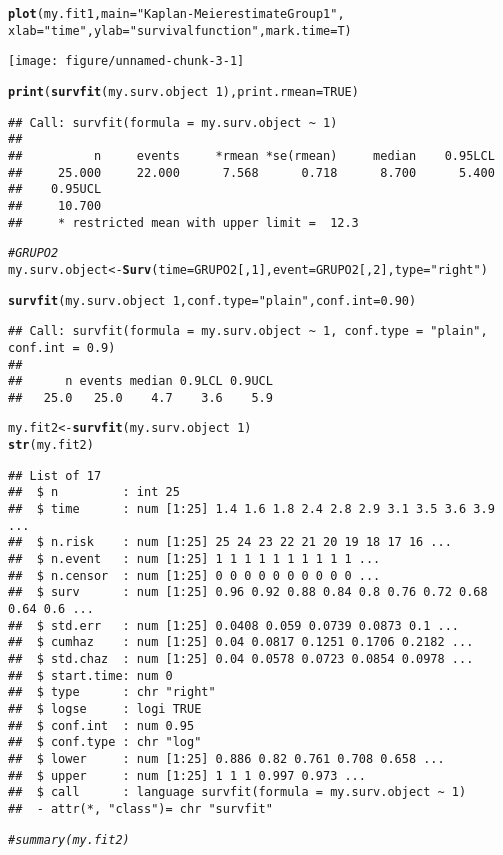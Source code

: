 \documentclass[10pt]{article}\usepackage[]{graphicx}\usepackage[]{color}
\makeatletter
\def\maxwidth{ %
  \ifdim\Gin@nat@width>\linewidth
    \linewidth
  \else
    \Gin@nat@width
  \fi
}
\newcommand{\hlnum}[1]{\textcolor[rgb]{0.686,0.059,0.569}{#1}}%
\newcommand{\hlstr}[1]{\textcolor[rgb]{0.192,0.494,0.8}{#1}}%
\newcommand{\hlcom}[1]{\textcolor[rgb]{0.678,0.584,0.686}{\textit{#1}}}%
\newcommand{\hlopt}[1]{\textcolor[rgb]{0,0,0}{#1}}%
\newcommand{\hlstd}[1]{\textcolor[rgb]{0.345,0.345,0.345}{#1}}%
\newcommand{\hlkwb}[1]{\textcolor[rgb]{0.69,0.353,0.396}{#1}}%
\newcommand{\hlkwc}[1]{\textcolor[rgb]{0.333,0.667,0.333}{#1}}%
\newcommand{\hlkwd}[1]{\textcolor[rgb]{0.737,0.353,0.396}{\textbf{#1}}}%
\newenvironment{kframe}{%
 \def\at@end@of@kframe{}%
 \ifinner\ifhmode%
  \def\at@end@of@kframe{\end{minipage}}%
  \begin{minipage}{\columnwidth}%
 \fi\fi%
 \def\FrameCommand##1{\hskip\@totalleftmargin \hskip-\fboxsep
 \colorbox{shadecolor}{##1}\hskip-\fboxsep
     \hskip-\linewidth \hskip-\@totalleftmargin \hskip\columnwidth}%
 \MakeFramed {\advance\hsize-\width
   \@totalleftmargin\z@ \linewidth\hsize
   \@setminipage}}%
 {\par\unskip\endMakeFramed%
 \at@end@of@kframe}
\newenvironment{knitrout}{}{} %
\makeatother
\begin{document}
{\begin{itemize}
\begin{knitrout}
\begin{kframe}
\begin{alltt}
\hlkwd{plot}\hlstd{(my.fit1,} \hlkwc{main}\hlstd{=}\hlstr{"Kaplan-Meier estimate Group 1"}\hlstd{,}
     \hlkwc{xlab}\hlstd{=}\hlstr{"time"}\hlstd{,} \hlkwc{ylab}\hlstd{=}\hlstr{"survival function"}\hlstd{,}\hlkwc{mark.time}\hlstd{=T)}
\end{alltt}
\end{kframe}
\texttt{[image: figure/unnamed-chunk-3-1]} 
\begin{kframe}\begin{alltt}
\hlkwd{print}\hlstd{(}\hlkwd{survfit}\hlstd{(my.surv.object} \hlopt{~} \hlnum{1}\hlstd{),} \hlkwc{print.rmean}\hlstd{=}\hlnum{TRUE}\hlstd{)}
\end{alltt}
\begin{verbatim}
## Call: survfit(formula = my.surv.object ~ 1)
## 
##          n     events     *rmean *se(rmean)     median    0.95LCL 
##     25.000     22.000      7.568      0.718      8.700      5.400 
##    0.95UCL 
##     10.700 
##     * restricted mean with upper limit =  12.3
\end{verbatim}
\begin{alltt}
\hlcom{#GRUPO 2}
\hlstd{my.surv.object}\hlkwb{<-}\hlkwd{Surv}\hlstd{(}\hlkwc{time}\hlstd{=GRUPO2[,}\hlnum{1}\hlstd{],}\hlkwc{event} \hlstd{= GRUPO2[,}\hlnum{2}\hlstd{],} \hlkwc{type} \hlstd{=} \hlstr{"right"}\hlstd{)}

\hlkwd{survfit}\hlstd{(my.surv.object} \hlopt{~} \hlnum{1}\hlstd{,}\hlkwc{conf.type}\hlstd{=}\hlstr{"plain"}\hlstd{,} \hlkwc{conf.int}\hlstd{=}\hlnum{0.90}\hlstd{)}
\end{alltt}
\begin{verbatim}
## Call: survfit(formula = my.surv.object ~ 1, conf.type = "plain", conf.int = 0.9)
## 
##      n events median 0.9LCL 0.9UCL 
##   25.0   25.0    4.7    3.6    5.9
\end{verbatim}
\begin{alltt}
\hlstd{my.fit2}\hlkwb{<-}\hlkwd{survfit}\hlstd{(my.surv.object} \hlopt{~} \hlnum{1}\hlstd{)}
\hlkwd{str}\hlstd{(my.fit2)}
\end{alltt}
\begin{verbatim}
## List of 17
##  $ n         : int 25
##  $ time      : num [1:25] 1.4 1.6 1.8 2.4 2.8 2.9 3.1 3.5 3.6 3.9 ...
##  $ n.risk    : num [1:25] 25 24 23 22 21 20 19 18 17 16 ...
##  $ n.event   : num [1:25] 1 1 1 1 1 1 1 1 1 1 ...
##  $ n.censor  : num [1:25] 0 0 0 0 0 0 0 0 0 0 ...
##  $ surv      : num [1:25] 0.96 0.92 0.88 0.84 0.8 0.76 0.72 0.68 0.64 0.6 ...
##  $ std.err   : num [1:25] 0.0408 0.059 0.0739 0.0873 0.1 ...
##  $ cumhaz    : num [1:25] 0.04 0.0817 0.1251 0.1706 0.2182 ...
##  $ std.chaz  : num [1:25] 0.04 0.0578 0.0723 0.0854 0.0978 ...
##  $ start.time: num 0
##  $ type      : chr "right"
##  $ logse     : logi TRUE
##  $ conf.int  : num 0.95
##  $ conf.type : chr "log"
##  $ lower     : num [1:25] 0.886 0.82 0.761 0.708 0.658 ...
##  $ upper     : num [1:25] 1 1 1 0.997 0.973 ...
##  $ call      : language survfit(formula = my.surv.object ~ 1)
##  - attr(*, "class")= chr "survfit"
\end{verbatim}
\begin{alltt}
\hlcom{#summary(my.fit2)}


\end{alltt}
\end{kframe}
\end{knitrout}
\end{itemize}}
\end{document}
